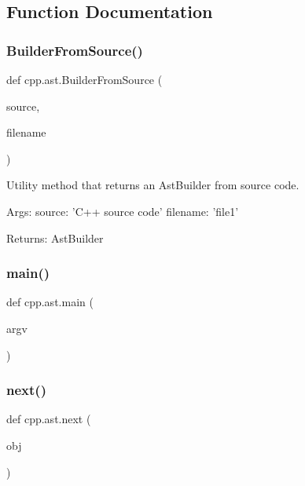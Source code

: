\subsection{Function Documentation}
\mbox{\label{namespacecpp_1_1ast_a696471f0d7971a0789824803a008cf6b}} 
\subsubsection{\texorpdfstring{Builder\+From\+Source()}{BuilderFromSource()}}
{\footnotesize\ttfamily def cpp.\+ast.\+Builder\+From\+Source (\begin{DoxyParamCaption}\item[{}]{source,  }\item[{}]{filename }\end{DoxyParamCaption})}

\begin{DoxyVerb}Utility method that returns an AstBuilder from source code.

Args:
  source: 'C++ source code'
  filename: 'file1'

Returns:
  AstBuilder
\end{DoxyVerb}
 \mbox{\label{namespacecpp_1_1ast_acd29cc27c3bff13bf3e055575b8e958a}} 
\subsubsection{\texorpdfstring{main()}{main()}}
{\footnotesize\ttfamily def cpp.\+ast.\+main (\begin{DoxyParamCaption}\item[{}]{argv }\end{DoxyParamCaption})}

\mbox{\label{namespacecpp_1_1ast_a39ad8261fef5e0a7c1c17c510541b66f}} 
\subsubsection{\texorpdfstring{next()}{next()}}
{\footnotesize\ttfamily def cpp.\+ast.\+next (\begin{DoxyParamCaption}\item[{}]{obj }\end{DoxyParamCaption})}

